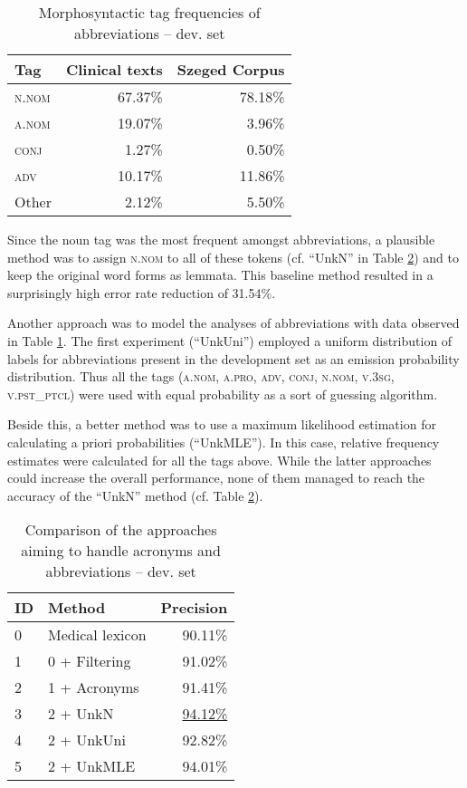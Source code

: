 \begin{table}
\centering
\caption{Morphosyntactic tag frequencies of abbreviations -- dev. set}
\label{tab:pos_distribution}
\begin{tabular}{ l r r} 
\hline
Tag & Clinical texts & Szeged Corpus  \\ 
\hline
\scshape{n.nom} & 67.37\% & 78.18\% \\
\scshape{a.nom} & 19.07\% & 3.96\% \\
\scshape{conj} & 1.27\% & 0.50\% \\
\scshape{adv} & 10.17\% & 11.86\% \\
Other & 2.12\% & 5.50\% \\
\hline
\end{tabular}
\end{table}

Since the noun tag was the most frequent amongst abbreviations, a plausible method  was to assign \textsc{n.nom} to all of these tokens (cf.  ``UnkN'' in Table \ref{tab:abbrev_fixes}) and to keep the original word forms as lemmata. This baseline method resulted in a surprisingly high error rate reduction of 31.54\%. 

Another approach was to model the analyses of abbreviations with data observed in Table \ref{tab:pos_distribution}. The first experiment (``UnkUni'') employed a uniform distribution of labels for abbreviations present in the development set as an emission probability distribution. 
Thus all the tags (\textsc{a.nom}, \textsc{a.pro}, \textsc{adv}, \textsc{conj}, \textsc{n.nom}, \textsc{v.3sg}, \textsc{v.pst\_ptcl}) were used with equal probability as a sort of guessing algorithm.

Beside this, a better method was to use a maximum likelihood estimation for calculating a priori probabilities (``UnkMLE''). In this case,  relative frequency estimates were calculated for all the tags above.
While the latter approaches could increase the overall performance, none of them managed to reach the accuracy of the ``UnkN'' method (cf. Table \ref{tab:abbrev_fixes}). 

\begin{table}
\centering
\caption{Comparison of the approaches aiming to handle acronyms and abbreviations --  dev. set}
\label{tab:abbrev_fixes}
\begin{tabular}{ l l r } 
\hline
ID & Method &  Precision \\
\hline
0 & Medical lexicon & 90.11\% \\
1 & 0 + Filtering & 91.02\% \\
2 & 1 + Acronyms & 91.41\% \\
3 & 2 + UnkN & \underline{94.12\%} \\
4 & 2 + UnkUni & 92.82\% \\
5 & 2 + UnkMLE & 94.01\% \\
\hline
\end{tabular}
\end{table}

